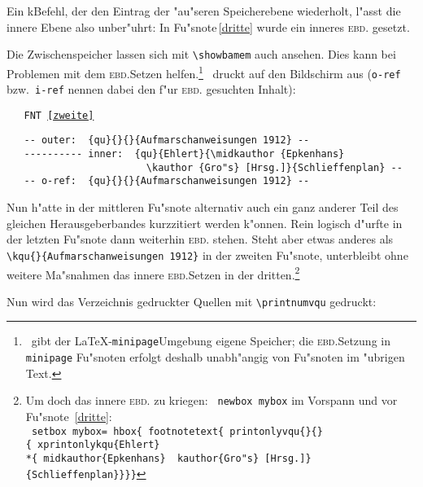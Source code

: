 \documentclass[12pt,a4paper]{article}
\newcommand{\pbs}{\string\ \unskip}
\newcommand{\bs}{\protect\pbs}
\begin{document}
\vspace{.5ex}\noindent
Ein k\fhy Befehl, der den Eintrag der "au"seren Speicherebene wiederholt, 
l"asst die innere Ebene also unber"uhrt: In Fu"snote\,\ref{dritte} wurde 
ein inneres \textsc{ebd.} gesetzt. 

Die Zwischenspeicher lassen sich mit \verb|\showbamem| auch ansehen. 
Dies kann bei Problemen mit dem \textsc{ebd.}\hy Setzen
helfen.\footnote{\BibArts\ gibt der \LaTeX-\texttt{minipage}\hy Umgebung 
eigene Speicher; die \textsc{ebd.}\hy Setzung in \texttt{minipage}\hy
Fu"snoten erfolgt deshalb unabh"angig von Fu"snoten im "ubrigen Text.}
\BibArts\ druckt auf den Bildschirm aus (\verb|o-ref| bzw.\ \verb|i-ref| nennen 
dabei den f"ur \textsc{ebd.} gesuchten Inhalt):

{\scriptsize\vspace{3ex}\noindent
\verb|   FNT |\texttt{\ref{zweite}}
\vspace{-3ex}
\begin{verbatim}
   -- outer:  {qu}{}{}{Aufmarschanweisungen 1912} -- 
   ---------- inner:  {qu}{Ehlert}{\midkauthor {Epkenhans}
                        \kauthor {Gro"s} [Hrsg.]}{Schlieffenplan} -- 
   -- o-ref:  {qu}{}{}{Aufmarschanweisungen 1912} -- 
\end{verbatim}}


\vspace{-.5ex}\noindent
Nun h"atte in der mittleren Fu"snote alternativ auch ein ganz anderer Teil des gleichen
Herausgeberbandes kurzzitiert werden k"onnen. Rein logisch d"urfte in der letzten 
Fu"snote dann weiterhin \textsc{ebd.} stehen. Steht aber etwas anderes als 
\verb|\kqu{}{Aufmarschanweisungen 1912}| in der 
zweiten Fu"snote, unterbleibt ohne weitere Ma"snahmen das innere \textsc{ebd.}\hy Setzen in 
der dritten.\footnote{Um doch das innere \textsc{ebd.} zu kriegen:
\texttt{\bs newbox\bs mybox} im Vorspann und vor Fu"snote~\ref{dritte}:
\\[.5ex] \hspace*{.75em} \texttt{\bs setbox\bs mybox=\bs hbox\{\bs footnotetext\{\bs printonlyvqu\{\}\{\}
\\ \hspace*{1em} \{\bs xprintonlykqu\{Ehlert\} 
\\ \hspace*{1.5em} *\{\bs midkauthor\{Epkenhans\} \bs kauthor\{Gro"s\} [Hrsg.]\}
\\ \hspace*{1.5em} \{Schlieffenplan\}\}\}\}}}

\vspace{1.5ex}\noindent
Nun wird das Verzeichnis gedruckter Quellen mit \verb|\printnumvqu| gedruckt:
\end{document}

